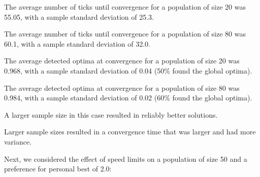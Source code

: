 \documentclass[12pt]{article}
\begin{document}
The average number of ticks until convergence for a population of size 20 was 55.05, with a sample standard deviation of 25.3.

The average number of ticks until convergence for a population of size 80 was 60.1, with a sample standard deviation of 32.0.

The average detected optima at convergence for a population of size 20 was 0.968, with a sample standard deviation of 0.04 (50\% found the global optima).

The average detected optima at convergence for a population of size 80 was 0.984, with a sample standard deviation of 0.02 (60\% found the global optima).

A larger sample size in this case resulted in reliably better solutions.

Larger sample sizes resulted in a convergence time that was larger and had more variance.

Next, we considered the effect of speed limits on a population of size 50 and a preference for personal best of 2.0:
\end{document}
